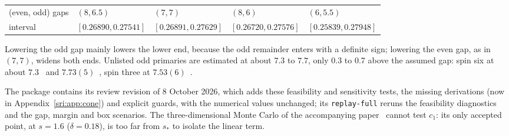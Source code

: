 \begin{itemize}
\begin{center}
\begin{tabular}{@{}lllll@{}}
\toprule
(even, odd) gaps & $(8,6.5)$ & $(7,7)$ & $(8,6)$ & $(6,5.5)$\\
interval & $[0.26890,0.27541]$ & $[0.26891,0.27629]$ & $[0.26720,0.27576]$ & $[0.25839,0.27948]$\\
\bottomrule
\end{tabular}
\end{center}
 Lowering the odd gap mainly lowers the lower end, because the odd remainder enters with a definite sign; lowering the
 even gap, as in $(7,7)$, widens both ends. Unlisted odd primaries are estimated at about $7.3$ to $7.7$, only
 0.3 to 0.7 above the assumed gap: spin six at about $7.3$~\cite{sri:Henriksson:2022} and $7.73(5)$~\cite{sri:Fardelli:2026},
 spin three at $7.53(6)$~\cite{sri:Fardelli:2026}.
\end{itemize}
The package contains its review revision of 8 October 2026, which adds these feasibility and sensitivity tests, the
missing derivations (now in Appendix~\ref{sri:app:cone}) and explicit guards, with the numerical values unchanged; its
\texttt{replay-full} reruns the feasibility diagnostics and the gap, margin and box scenarios. The three-dimensional
Monte Carlo of the accompanying paper~\cite{sri:Paper} cannot test $c_1$: its only accepted point, at $s=1.6$
($\delta=0.18$), is too far from $s_*$ to isolate the linear term.

